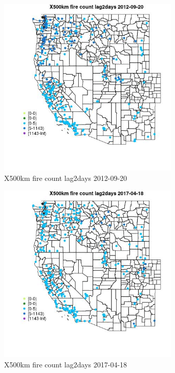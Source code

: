 \begin{figure} 
\centering  
\includegraphics[width=0.77\textwidth]{Code_Outputs/Report_ML_input_PM25_Step4_part_e_de_duplicated_aves_compiled_2019-05-14wNAs_MapObsX500km_fire_count_lag2days2012-09-20.jpg} 
\caption{\label{fig:Report_ML_input_PM25_Step4_part_e_de_duplicated_aves_compiled_2019-05-14wNAsMapObsX500km_fire_count_lag2days2012-09-20}X500km fire count lag2days 2012-09-20} 
\end{figure} 
 

\begin{figure} 
\centering  
\includegraphics[width=0.77\textwidth]{Code_Outputs/Report_ML_input_PM25_Step4_part_e_de_duplicated_aves_compiled_2019-05-14wNAs_MapObsX500km_fire_count_lag2days2017-04-18.jpg} 
\caption{\label{fig:Report_ML_input_PM25_Step4_part_e_de_duplicated_aves_compiled_2019-05-14wNAsMapObsX500km_fire_count_lag2days2017-04-18}X500km fire count lag2days 2017-04-18} 
\end{figure} 
 

